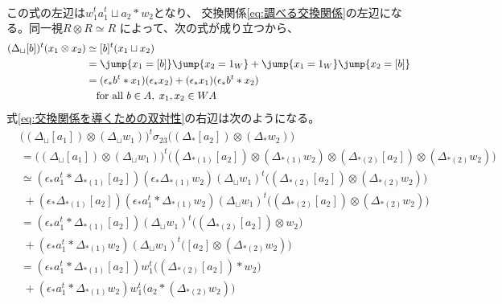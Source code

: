 \begin{itemize}
\begin{equation}
\begin{split}
		\end{split}\end{equation} %
		この式の左辺は$w_1^ta_1^t\sqcup a_2* w_2$となり、
		交換関係\eqref{eq:調べる交換関係}の左辺になる。同一視$R\otimes R\simeq R$
		によって、次の式が成り立つから、
		\begin{equation*}\begin{split} %
			(\Delta_\sqcup[b])^t(x_1\otimes x_2) &\simeq [b]^t(x_1\sqcup x_2) \\
			&= \jump{x_1=[b]}\jump{x_2=1_W} + \jump{x_1=1_W}\jump{x_2=[b]} \\
			&= (\epsilon_*{b^t*x_1})(\epsilon_*{x_2}) 
				+ (\epsilon_*{x_1})(\epsilon_*{b^t*x_2}) \\
			& \quad\text{for all }b\in A,\;x_1,x_2\in WA
		\end{split}\end{equation*} %
		式\eqref{eq:交換関係を導くための双対性}の右辺は次のようになる。
		\begin{equation*}\begin{split} %
			& \bigl((\Delta_\sqcup[a_1])\otimes(\Delta_\sqcup w_1)\bigr)^t
				\sigma_{23}\bigl((\Delta_*[a_2])\otimes(\Delta_*w_2)\bigr) \\
			&= \bigl((\Delta_\sqcup[a_1])\otimes(\Delta_\sqcup w_1)\bigr)^t
				\bigl((\Delta_{*(1)}[a_2])\otimes(\Delta_{*(1)}w_2)\otimes(\Delta_{*(2)}[a_2])\otimes(\Delta_{*(2)}w_2)\bigr) \\
			&\simeq (\epsilon_*a_1^t*\Delta_{*(1)}[a_2])(\epsilon_*\Delta_{*(1)}w_2)
				(\Delta_\sqcup w_1)^t\bigl((\Delta_{*(2)}[a_2])\otimes(\Delta_{*(2)}w_2)\bigr) \\
			&\;+ (\epsilon_*\Delta_{*(1)}[a_2])(\epsilon_*a_1^t*\Delta_{*(1)}w_2)
				(\Delta_\sqcup w_1)^t\bigl((\Delta_{*(2)}[a_2])\otimes(\Delta_{*(2)}w_2)\bigr) \\
			&= (\epsilon_*a_1^t*\Delta_{*(1)}[a_2])(\Delta_\sqcup w_1)^t
				\bigl((\Delta_{*(2)}[a_2])\otimes w_2\bigr) \\
			&\;+ (\epsilon_*a_1^t*\Delta_{*(1)}w_2)(\Delta_\sqcup w_1)^t
				\bigl([a_2]\otimes(\Delta_{*(2)}w_2)\bigr) \\
			&= (\epsilon_*a_1^t*\Delta_{*(1)}[a_2])w_1^t
				\bigl((\Delta_{*(2)}[a_2])* w_2\bigr) \\
			&\;+ (\epsilon_*a_1^t*\Delta_{*(1)}w_2)w_1^t
				\bigl(a_2*(\Delta_{*(2)}w_2)\bigr) \\
		\end{split}\end{equation*} %
	\end{itemize} %
